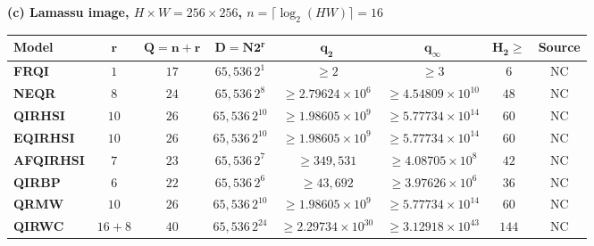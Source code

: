 \documentclass[11pt,a4paper]{article}
\begin{document}
{\begin{table}
\par\vspace{0.3cm}
\textbf{(c) Lamassu image, $H\times W=256\times256$, $n=\lceil\log_2(HW)\rceil=16$}\\[3pt]
{\footnotesize\setlength{\tabcolsep}{4pt}
\begin{tabular}{lccccccc}
\hline\rowcolor{Bisque3}
\textbf{Model} & $\boldsymbol{r}$ & $\boldsymbol{Q=n+r}$ & $\boldsymbol{D=N2^r}$ & $\boldsymbol{q_2}$ & $\boldsymbol{q_\infty}$ & $\boldsymbol{H_2\geq}$ & \textbf{Source}\\
\hline
\textbf{FRQI} & \(1\) & \(17\) & \(65{,}536\,2^{1}\) & $\geq 2$ & $\geq 3$ & \(6\) & NC \\
\textbf{NEQR} & \(8\) & \(24\) & \(65{,}536\,2^{8}\) & $\geq 2.79624\times10^{6}$ & $\geq 4.54809\times10^{10}$ & \(48\) & NC \\
\textbf{QIRHSI} & \(10\) & \(26\) & \(65{,}536\,2^{10}\) & $\geq 1.98605\times10^{9}$ & $\geq 5.77734\times10^{14}$ & \(60\) & NC \\
\textbf{EQIRHSI} & \(10\) & \(26\) & \(65{,}536\,2^{10}\) & $\geq 1.98605\times10^{9}$ & $\geq 5.77734\times10^{14}$ & \(60\) & NC \\
\textbf{AFQIRHSI} & \(7\) & \(23\) & \(65{,}536\,2^{7}\) & $\geq 349{,}531$ & $\geq 4.08705\times10^{8}$ & \(42\) & NC \\
\textbf{QIRBP} & \(6\) & \(22\) & \(65{,}536\,2^{6}\) & $\geq 43{,}692$ & $\geq 3.97626\times10^{6}$ & \(36\) & NC \\
\textbf{QRMW} & \(10\) & \(26\) & \(65{,}536\,2^{10}\) & $\geq 1.98605\times10^{9}$ & $\geq 5.77734\times10^{14}$ & \(60\) & NC \\
\textbf{QIRWC} & \(16+8\) & \(40\) & \(65{,}536\,2^{24}\) & $\geq 2.29734\times10^{30}$ & $\geq 3.12918\times10^{43}$ & \(144\) & NC \\
\hline\end{tabular}}\par


\end{table}}
\end{document}
